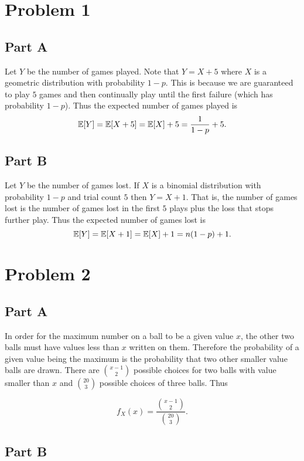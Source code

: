 \documentclass{eeleyes}
\begin{document}
\section*{Problem 1}
\subsection*{Part A}
Let $Y$ be the number of games played. Note that $Y = X + 5$ where $X$ is a geometric distribution with probability $1-p$. This is because we are guaranteed to play $5$ games and then continually play until the first failure (which has probability $1 - p$). Thus the expected number of games played is
\[
    \mathbb{E}\qty[Y] = \mathbb{E}\qty[X + 5] = \mathbb{E}\qty[X] + 5 = \frac{1}{1 - p} + 5
.\]

\subsection*{Part B}
Let $Y$ be the number of games lost. If $X$ is a binomial distribution with probability $1 - p$ and trial count $5$ then $Y = X + 1$. That is, the number of games lost is the number of games lost in the first $5$ plays plus the loss that stops further play. Thus the expected number of games lost is
\[
    \mathbb{E}\qty[Y] = \mathbb{E}\qty[X + 1] = \mathbb{E}\qty[X] + 1 = n(1 - p) + 1
.\]

\section*{Problem 2}
\subsection*{Part A}
In order for the maximum number on a ball to be a given value $x$, the other two balls must have values less than $x$ written on them. Therefore the probability of a given value being the maximum is the probability that two other smaller value balls are drawn. There are $\binom{x-1}{2}$ possible choices for two balls with value smaller than $x$ and $\binom{20}{3}$ possible choices of three balls. Thus

\[
    f_X(x) = \frac{\binom{x - 1}{2}}{\binom{20}{3}}
.\]

\subsection*{Part B}
\end{document}
